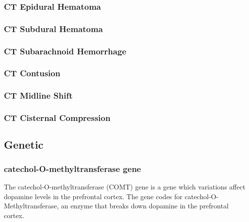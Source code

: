 \documentclass[11pt]{article}
\begin{document}
\subsubsection{CT Epidural Hematoma}
\subsubsection{CT Subdural Hematoma}
\subsubsection{CT Subarachnoid Hemorrhage}
\subsubsection{CT Contusion}
\subsubsection{CT Midline Shift}
\subsubsection{CT Cisternal Compression}

\subsection{Genetic}

\subsubsection{catechol-O-methyltransferase gene}
The catechol-O-methyltransferase (COMT) gene is a gene which variations affect dopamine levels in the prefrontal cortex\cite{COMTSNPedia}. The gene codes for catechol-O-Methyltransferase, an enzyme that breaks down dopamine in the prefrontal cortex\cite{Rs4680SNPedia}.
\end{document}
